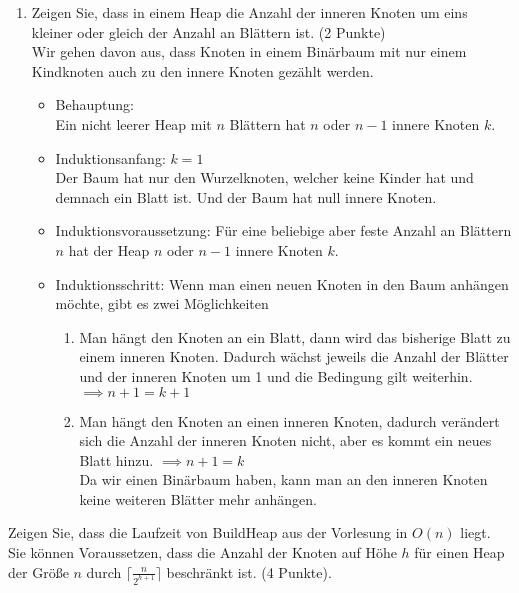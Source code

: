 \documentclass[ngerman,landscape,twocolumn]{adtexsheet}
\begin{document}
\begin{question}
\begin{enumerate}
    \item Zeigen Sie, dass in einem Heap die Anzahl der inneren Knoten um eins kleiner oder gleich der Anzahl an Blättern ist. (2 Punkte) \\
    
    Wir gehen davon aus, dass Knoten in einem Binärbaum mit nur einem Kindknoten auch zu den innere Knoten gezählt werden.
    
        \begin{itemize}
            \item Behauptung:\\ Ein nicht leerer Heap mit $n$ Blättern hat $n$ oder $n-1$ innere Knoten $k$.
            \item Induktionsanfang: $k=1$ \\
                Der Baum hat nur den Wurzelknoten, welcher keine Kinder hat und demnach ein Blatt ist. Und der Baum hat null innere Knoten. \checkmark
            \item Induktionsvoraussetzung: Für eine beliebige aber feste Anzahl an Blättern $n$ hat der Heap $n$ oder $n-1$ innere Knoten $k$.
            \item Induktionsschritt: Wenn man einen neuen Knoten in den Baum anhängen möchte, gibt es zwei Möglichkeiten
            \begin{enumerate}
                \item Man hängt den Knoten an ein Blatt, dann wird das bisherige Blatt zu einem inneren Knoten. Dadurch wächst jeweils die Anzahl der Blätter und der inneren Knoten um 1 und die Bedingung gilt weiterhin. $\implies n+1 = k+1$ \checkmark
                \item Man hängt den Knoten an einen inneren Knoten, dadurch verändert sich die Anzahl der inneren Knoten nicht, aber es kommt ein neues Blatt hinzu. $\implies n+1 = k$ \checkmark\\ Da wir einen Binärbaum haben, kann man an den inneren Knoten keine weiteren Blätter mehr anhängen.
            \end{enumerate}
        \end{itemize}
    \end{enumerate}
\end{question}

\newpage
{}

\begin{question}
Zeigen Sie, dass die Laufzeit von BuildHeap aus der Vorlesung in $O(n)$ liegt. Sie können Voraussetzen, dass die Anzahl der Knoten auf Höhe $h$ für einen Heap der Größe $n$ durch $\lceil \frac{n}{2^{h+1}} \rceil$ beschränkt ist. (4 Punkte).
\end{question}
\end{document}
